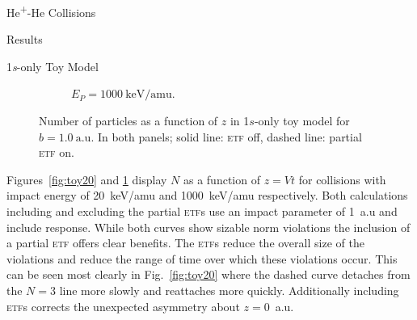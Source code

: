 \documentclass[letterpaper, 11 pt]{report}
\begin{document}
\begin{chapter}{\texorpdfstring{He\textsuperscript{+}}{He+}-He Collisions \label{chap:hephe}}
\begin{section}{Results \label{sec:hephe-disc}}
\begin{subsection}{1\textit{s}-only Toy Model \label{sec:toy}}
\begin{figure}[t]
\begin{subfigure}{.5\textwidth}
               \caption{$E_P = 1000~\mathrm{keV}/\mathrm{amu}$. \label{fig:toy1000}}
            \end{subfigure}
            \caption[Number of particles as a function of \textit{z} in 1\textit{s}-only toy model]
                    {Number of particles as a function of $z$ in 1$s$-only toy model for $b = 1.0~
                    \mathrm{a.u}$. In both panels; solid line: \textsc{etf} off, dashed line:
                    partial \textsc{etf} on. \label{fig:toy}}
         \end{figure}

         Figures~\ref{fig:toy20} and \ref{fig:toy1000} display $N$ as a function of $z = Vt$ for
         collisions with impact energy of 20~keV/amu and 1000~keV/amu respectively. Both calculations
         including and excluding the partial \textsc{etf}s use an impact parameter of 1~a.u and include
         response. While both curves show sizable norm violations the inclusion of a partial
         \textsc{etf} offers clear benefits. The \textsc{etf}s reduce the overall size of the violations
         and reduce the range of time over which these violations occur. This can be seen most clearly
         in Fig.~\ref{fig:toy20} where the dashed curve detaches from the $N = 3$ line more slowly and
         reattaches more quickly. Additionally including \textsc{etf}s corrects the unexpected asymmetry
         about $z = 0$~a.u.


\end{subsection}
\end{section}
\end{chapter}
\end{document}
